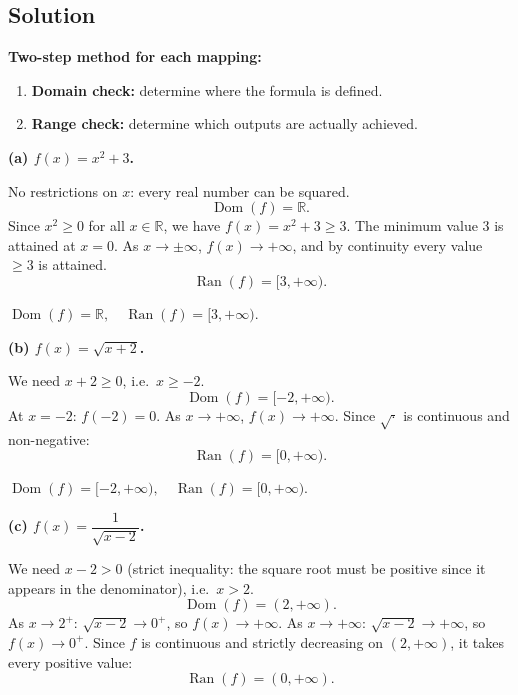 \documentclass[12pt, a4paper]{article}
\newcommand{\R}{\mathbb{R}}
\begin{document}
\subsection*{Solution}

\textbf{Two-step method for each mapping:}
\begin{enumerate}[nosep]
  \item \textbf{Domain check:} determine where the formula is defined.
  \item \textbf{Range check:} determine which outputs are actually achieved.
\end{enumerate}

\medskip

\textbf{(a)\; $f(x) = x^2 + 3$.}

No restrictions on $x$: every real number can be squared.
\[
  \operatorname{Dom}(f) = \R.
\]
Since $x^2 \ge 0$ for all $x \in \R$, we have $f(x) = x^2 + 3 \ge 3$.
The minimum value $3$ is attained at $x = 0$.
As $x \to \pm\infty$, $f(x) \to +\infty$, and by continuity every value $\ge 3$ is attained.
\[
  \operatorname{Ran}(f) = [3, +\infty).
\]

\begin{answerbox}
$\operatorname{Dom}(f) = \R, \quad \operatorname{Ran}(f) = [3, +\infty).$
\end{answerbox}

\bigskip
\textbf{(b)\; $f(x) = \sqrt{x+2}$.}

We need $x + 2 \ge 0$, i.e.\ $x \ge -2$.
\[
  \operatorname{Dom}(f) = [-2, +\infty).
\]
At $x = -2$: $f(-2) = 0$. As $x \to +\infty$, $f(x) \to +\infty$.
Since $\sqrt{\cdot}$ is continuous and non-negative:
\[
  \operatorname{Ran}(f) = [0, +\infty).
\]

\begin{answerbox}
$\operatorname{Dom}(f) = [-2, +\infty), \quad \operatorname{Ran}(f) = [0, +\infty).$
\end{answerbox}

\bigskip
\textbf{(c)\; $f(x) = \dfrac{1}{\sqrt{x-2}}$.}

We need $x - 2 > 0$ (strict inequality: the square root must be positive since it appears in the denominator), i.e.\ $x > 2$.
\[
  \operatorname{Dom}(f) = (2, +\infty).
\]
As $x \to 2^+$: $\sqrt{x-2} \to 0^+$, so $f(x) \to +\infty$.
As $x \to +\infty$: $\sqrt{x-2} \to +\infty$, so $f(x) \to 0^+$.
Since $f$ is continuous and strictly decreasing on $(2, +\infty)$, it takes every positive value:
\[
  \operatorname{Ran}(f) = (0, +\infty).
\]
\end{document}
